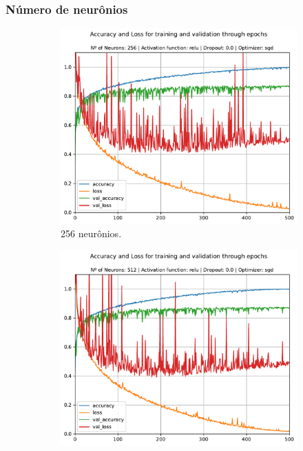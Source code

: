 \subsubsection{Número de neurônios}

\begin{figure}[H]
	\centering
	\begin{subfigure}[H]{0.49\textwidth}
		\includegraphics[width = \textwidth]{../../plot/mlp/mlp_256_relu_0.0_sgd}
		\caption{256 neurônios.}
		\label{fig:mlp_256_relu_0.0_sgd}
	\end{subfigure}
	\begin{subfigure}[H]{0.49\textwidth}
		\centering
		\includegraphics[width = \textwidth]{../../plot/mlp/mlp_512_relu_0.0_sgd}

\end{subfigure}
\end{figure}
